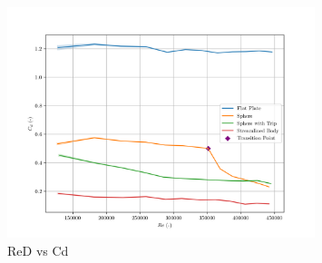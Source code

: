 \documentclass[8pt]{article}
\begin{document}
\begin{figure}[H]
    \centering
    \includegraphics[width=0.8\textwidth]{Re_vs_Cd.png}
    \caption{ReD vs Cd}
    \label{fig:figure5}
\end{figure}
\end{document}
